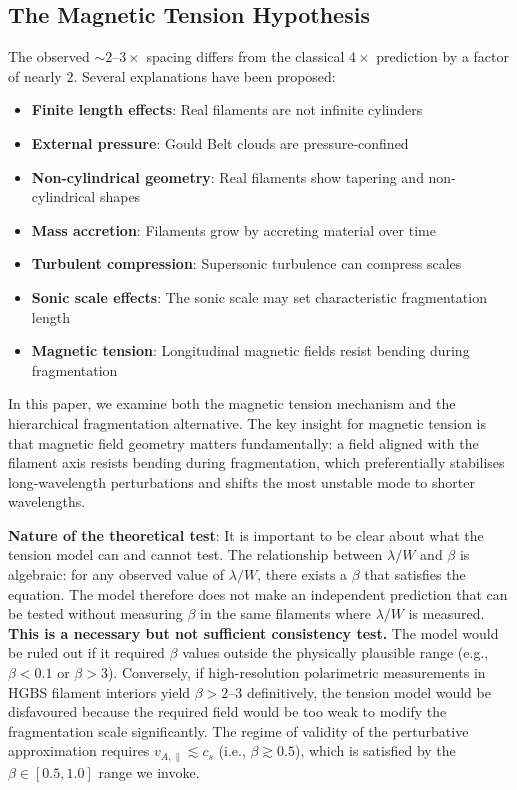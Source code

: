 \documentclass[11pt,a4paper]{article}
\begin{document}
\subsection{The Magnetic Tension Hypothesis}

The observed $\sim2$--$3\times$ spacing differs from the classical $4\times$ prediction by a factor of nearly 2. Several explanations have been proposed:

\begin{itemize}
    \item \textbf{Finite length effects}: Real filaments are not infinite cylinders \citep{Inutsuka1997}
    \item \textbf{External pressure}: Gould Belt clouds are pressure-confined \citep{Fischera2012}
    \item \textbf{Non-cylindrical geometry}: Real filaments show tapering and non-cylindrical shapes
    \item \textbf{Mass accretion}: Filaments grow by accreting material over time \citep{Heitsch2013, Chen2024}
    \item \textbf{Turbulent compression}: Supersonic turbulence can compress scales \citep{Padoan2011}
    \item \textbf{Sonic scale effects}: The sonic scale may set characteristic fragmentation length \citep{Federrath2016}
    \item \textbf{Magnetic tension}: Longitudinal magnetic fields resist bending during fragmentation
\end{itemize}

In this paper, we examine both the magnetic tension mechanism and the hierarchical fragmentation alternative. The key insight for magnetic tension is that magnetic field geometry matters fundamentally: a field aligned with the filament axis resists bending during fragmentation, which preferentially stabilises long-wavelength perturbations and shifts the most unstable mode to shorter wavelengths.

\textbf{Nature of the theoretical test}: It is important to be clear about what the tension model can and cannot test. The relationship between $\lambda/W$ and $\beta$ is algebraic: for any observed value of $\lambda/W$, there exists a $\beta$ that satisfies the equation. The model therefore does not make an independent prediction that can be tested without measuring $\beta$ in the same filaments where $\lambda/W$ is measured. \textbf{This is a necessary but not sufficient consistency test.} The model would be ruled out if it required $\beta$ values outside the physically plausible range (e.g., $\beta < 0.1$ or $\beta > 3$). Conversely, if high-resolution polarimetric measurements in HGBS filament interiors yield $\beta > 2$--$3$ definitively, the tension model would be disfavoured because the required field would be too weak to modify the fragmentation scale significantly. The regime of validity of the perturbative approximation requires $v_{A,\parallel} \lesssim c_s$ (i.e., $\beta \gtrsim 0.5$), which is satisfied by the $\beta \in [0.5, 1.0]$ range we invoke.
\end{document}
